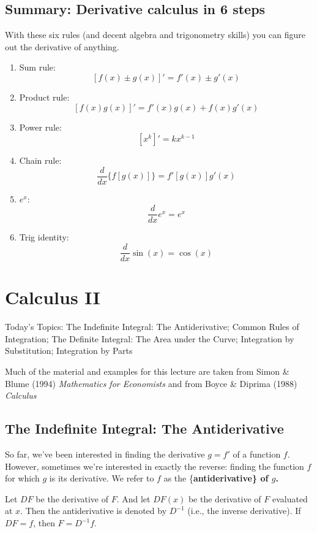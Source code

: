 \documentclass[]{book}
\providecommand{\tightlist}{%
  \setlength{\itemsep}{0pt}\setlength{\parskip}{0pt}}
\theoremstyle{definition}
\theoremstyle{definition}
\theoremstyle{definition}
\theoremstyle{remark}
\begin{document}
\section{Summary: Derivative calculus in 6
steps}\label{summary-derivative-calculus-in-6-steps}

With these six rules (and decent algebra and trigonometry skills) you
can figure out the derivative of anything.

\begin{enumerate}
\def\labelenumi{\arabic{enumi}.}
\tightlist
\item
  Sum rule: \[[f(x)\pm g(x)]' = f'(x)\pm g'(x)\]
\item
  Product rule: \[[f(x)g(x)]' = f'(x)g(x)+f(x)g'(x)\]
\item
  Power rule: \[[x^k]' = k x^{k-1}\]
\item
  Chain rule: \[\frac{d}{dx} \{ f[g(x)] \} = f'[g(x)] g'(x)\]
\item
  \(e^x\): \[\frac{d}{dx} e^x = e^x\]
\item
  Trig identity: \[\frac{d}{dx} \sin(x) = \cos(x)\]
\end{enumerate}

\chapter{Calculus II}\label{calculus-ii}

Today's Topics: The Indefinite Integral: The Antiderivative; Common
Rules of Integration; The Definite Integral: The Area under the Curve;
Integration by Substitution; Integration by Parts

Much of the material and examples for this lecture are taken from Simon
\& Blume (1994) \emph{Mathematics for Economists} and from Boyce \&
Diprima (1988) \emph{Calculus}

\section{The Indefinite Integral: The
Antiderivative}\label{the-indefinite-integral-the-antiderivative}

So far, we've been interested in finding the derivative \(g=f'\) of a
function \(f\). However, sometimes we're interested in exactly the
reverse: finding the function \(f\) for which \(g\) is its derivative.
We refer to \(f\) as the \{\bf antiderivative\} of \(g\).

Let \(DF\) be the derivative of \(F\). And let \(DF(x)\) be the
derivative of \(F\) evaluated at \(x\). Then the antiderivative is
denoted by \(D^{-1}\) (i.e., the inverse derivative). If \(DF=f\), then
\(F=D^{-1}f\).
\end{document}

